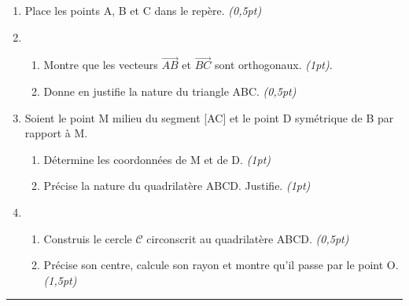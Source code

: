 \documentclass[12pt,a4paper]{book}
\begin{document}
\begin{enumerate}
\item Place les points A, B et C dans le repère. \emph{(0,5pt)}
\item \begin{enumerate}
\item Montre que les vecteurs $\overrightarrow{AB}$ et $\overrightarrow{BC}$ sont orthogonaux. \emph{(1pt)}.
\item Donne en justifie la nature du triangle ABC. \emph{(0,5pt)}
\end{enumerate}
\item Soient le point M milieu du segment [AC] et le point D symétrique de B par rapport à M.
\begin{enumerate}
\item Détermine les coordonnées de M et de D. \emph{(1pt)}
\item Précise la nature du quadrilatère ABCD. Justifie. \emph{(1pt)}
\end{enumerate} 
\item \begin{enumerate}
\item Construis le cercle $\mathcal{C}$ circonscrit au quadrilatère ABCD. \emph{(0,5pt)}
\item Précise son centre, calcule son rayon et montre qu'il passe par le point O. \emph{(1,5pt)}
\end{enumerate}
\end{enumerate}
\vspace{0,5cm}
\hrule
\vspace{0,5cm}
\end{document}
